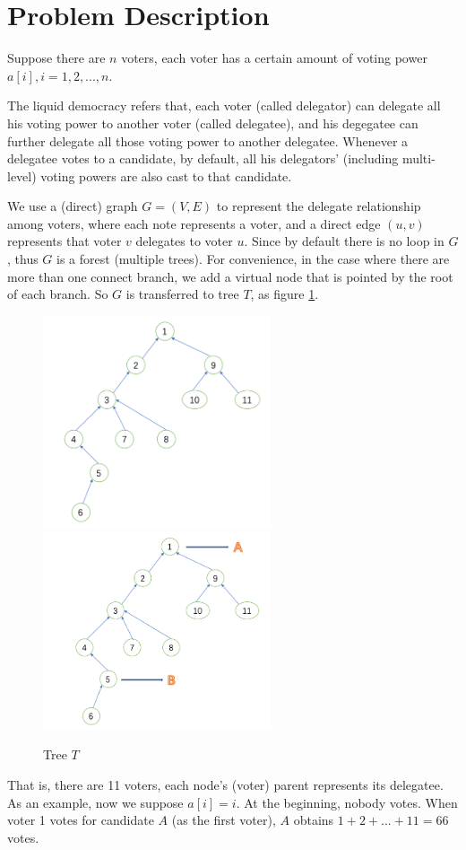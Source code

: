\section{Problem Description}
Suppose there are $n$ voters, each voter has a certain amount of voting power $a[i],i=1,2,...,n$.

The liquid democracy refers that, each voter (called delegator) can delegate all his voting power to another voter (called delegatee), and his degegatee can further delegate all those voting power to another delegatee. Whenever a delegatee votes to a candidate, by default, all his delegators' (including multi-level) voting powers are also cast to that candidate. 

We use a (direct) graph $G=(V,E)$ to represent the delegate relationship among voters, where each note represents a voter, and a direct edge $(u,v)$ represents that voter $v$ delegates to voter $u$. Since by default there is no loop in $G$, thus $G$ is a forest (multiple trees). For convenience, in the case where there are more than one connect branch, we add a virtual node that is pointed by the root of each branch. So $G$ is transferred to tree $T$, as figure \ref{fig:1}.

\begin{figure}
	\label{fig:1}
	\includegraphics[width=0.6\textwidth]{1.png}
	\includegraphics[width=0.6\textwidth]{2.png}
	\caption{Tree $T$}
\end{figure}
That is, there are 11 voters, each node's  (voter) parent represents its delegatee. As an example, now we  suppose $a[i]=i$. At the beginning, nobody votes. When voter 1 votes for candidate $A$ (as the first voter), $A$ obtains $1+2+...+11=66$ votes. 

